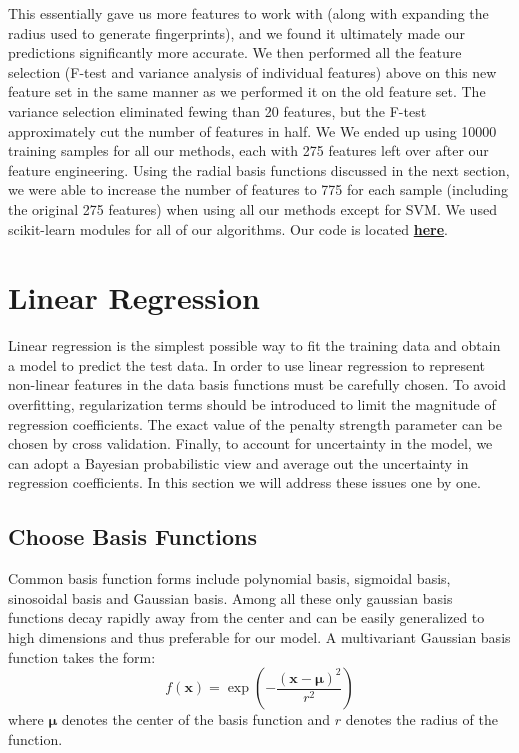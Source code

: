 \documentclass[11pt]{article}
\begin{document}
This essentially gave us more features to work with (along with expanding the radius used to generate fingerprints), and we found it ultimately made our predictions significantly more accurate. We then performed all the feature selection (F-test and variance analysis of individual features) above on this new feature set in the same manner as we performed it on the old feature set. The variance selection eliminated fewing than 20 features, but the F-test approximately cut the number of features in half. We  We ended up using 10000 training samples for all our methods, each with 275 features left over after our feature engineering. Using the radial basis functions discussed in the next section, we were able to increase the number of features to 775 for each sample (including the original 275 features) when using all our methods except for SVM. We used scikit-learn modules for all of our algorithms. Our code is located \href{https://github.com/bboz862/practical1.git}{\textbf{here}}.


\section{Linear Regression}
Linear regression is the simplest possible way to fit the training data and obtain a model to predict the test data. In order to use linear regression to represent non-linear features in the data basis functions must be carefully chosen. To avoid overfitting, regularization terms should be introduced to limit the magnitude of regression coefficients. The exact value of the penalty strength parameter can be chosen by cross validation. Finally, to account for uncertainty in the model, we can adopt a Bayesian probabilistic view and average out the uncertainty in regression coefficients. In this section we will address these issues one by one.
\subsection{Choose Basis Functions}\label{choose basis function}
Common basis function forms include polynomial basis, sigmoidal basis, sinosoidal basis and Gaussian basis. Among all these only gaussian basis functions decay rapidly away from the center and can be easily generalized to high dimensions and thus preferable for our model. A multivariant Gaussian basis function takes the form:
$$f(\textbf{x}) = \exp \left(-\frac{(\textbf{x} - \boldsymbol{\mu})^2}{r^2}\right)$$
where $\boldsymbol{\mu}$ denotes the center of the basis function and $r$ denotes the radius of the function. 
\end{document}
